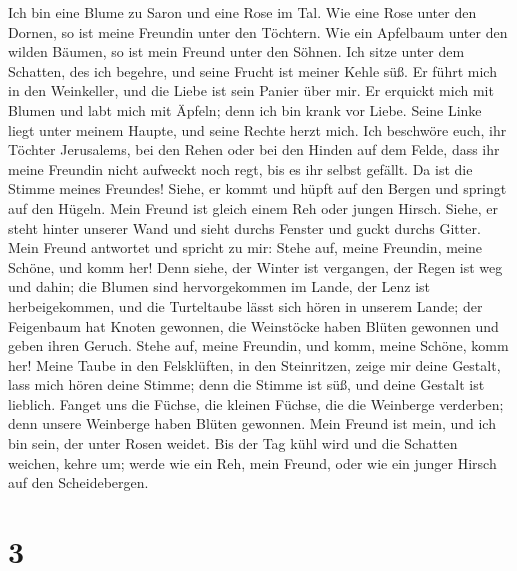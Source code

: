 Ich bin eine Blume zu Saron und eine Rose im Tal.
 Wie eine Rose unter den Dornen, so ist meine Freundin
unter den Töchtern.  Wie ein Apfelbaum unter den wilden
Bäumen, so ist mein Freund unter den Söhnen. Ich sitze unter dem
Schatten, des ich begehre, und seine Frucht ist meiner Kehle süß.
 Er führt mich in den Weinkeller, und die Liebe ist sein
Panier über mir.  Er erquickt mich mit Blumen und labt
mich mit Äpfeln; denn ich bin krank vor Liebe.  Seine
Linke liegt unter meinem Haupte, und seine Rechte herzt mich.
 Ich beschwöre euch, ihr Töchter Jerusalems, bei den Rehen
oder bei den Hinden auf dem Felde, dass ihr meine Freundin nicht
aufweckt noch regt, bis es ihr selbst gefällt.  Da ist die
Stimme meines Freundes! Siehe, er kommt und hüpft auf den Bergen und
springt auf den Hügeln.  Mein Freund ist gleich einem Reh
oder jungen Hirsch. Siehe, er steht hinter unserer Wand und sieht durchs
Fenster und guckt durchs Gitter.  Mein Freund antwortet
und spricht zu mir: Stehe auf, meine Freundin, meine Schöne, und komm
her!  Denn siehe, der Winter ist vergangen, der Regen ist
weg und dahin;  die Blumen sind hervorgekommen im Lande,
der Lenz ist herbeigekommen, und die Turteltaube lässt sich hören in
unserem Lande;  der Feigenbaum hat Knoten gewonnen, die
Weinstöcke haben Blüten gewonnen und geben ihren Geruch. Stehe auf,
meine Freundin, und komm, meine Schöne, komm her!  Meine
Taube in den Felsklüften, in den Steinritzen, zeige mir deine Gestalt,
lass mich hören deine Stimme; denn die Stimme ist süß, und deine Gestalt
ist lieblich.  Fanget uns die Füchse, die kleinen Füchse,
die die Weinberge verderben; denn unsere Weinberge haben Blüten
gewonnen.  Mein Freund ist mein, und ich bin sein, der
unter Rosen weidet.  Bis der Tag kühl wird und die
Schatten weichen, kehre um; werde wie ein Reh, mein Freund, oder wie ein
junger Hirsch auf den Scheidebergen.

\hypertarget{section-2}{%
\section{3}\label{section-2}}

